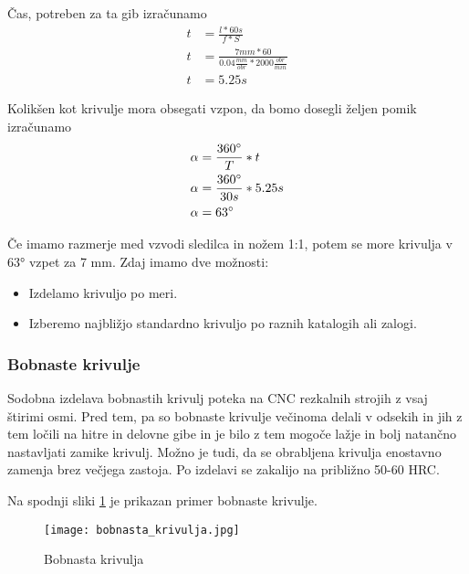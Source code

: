 Čas, potreben za ta gib izračunamo
\begin{equation}
	\label{cas_za_hod}
	\begin{split}
		t &= \frac{l*60s}{f*S} \\
		t &= \frac{7mm*60}{0.04\frac{mm}{obr}*2000\frac{obr}{min}} \\
		t &= 5.25s
	\end{split}
\end{equation}

Kolikšen kot krivulje mora obsegati vzpon, da bomo
dosegli željen pomik izračunamo
\begin{equation}
	\label{kot_krivulje}
	\begin{split}
		\alpha &= \frac{360\degree}{T} * t \\
		\alpha &= \frac{360\degree}{30s} * 5.25s \\
		\alpha &= 63\degree
	\end{split}
\end{equation}

Če imamo razmerje med vzvodi sledilca in nožem 1:1, potem se more krivulja v 63° vzpet za 7 mm.
Zdaj imamo dve možnosti:
\begin{itemize}
	\item Izdelamo krivuljo po meri.
	\item Izberemo najbližjo standardno krivuljo po raznih katalogih ali zalogi.
\end{itemize}

\subsubsection{Bobnaste krivulje}
Sodobna izdelava bobnastih krivulj poteka na CNC rezkalnih strojih
z vsaj štirimi osmi. Pred tem, pa so bobnaste krivulje večinoma delali v
odsekih in jih z tem ločili na hitre in delovne gibe in je bilo z tem
mogoče lažje in bolj natančno nastavljati zamike krivulj.
Možno je tudi, da se obrabljena krivulja enostavno zamenja brez
večjega zastoja. Po izdelavi se zakalijo na približno 50-60 HRC.

Na spodnji sliki \ref{bobnaste_krivulje} je prikazan primer
bobnaste krivulje.

\begin{figure}[H]
	\begin{center}
		\texttt{[image: bobnasta\_krivulja.jpg]}
		\caption{Bobnasta krivulja
			\cite{lasten}}
		\label{bobnaste_krivulje}
	\end{center}
\end{figure}

